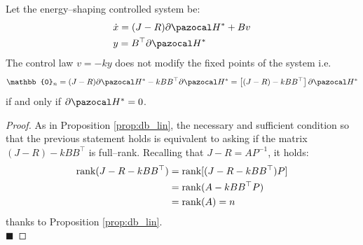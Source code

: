 \begin{prop}
Let the energy--shaping controlled system be:
\begin{align*}
    &\dot{x}=(J-R)\partial\Ha^* + Bv\\
    &y = B^\top\partial\Ha^* 
\end{align*}
The control law $v = -ky$ does not modify the fixed points of the system i.e.
\[\mathbb{0}_n=(J-R)\partial\Ha^*-kBB^\top\partial\Ha^*=\left[(J-R)-kBB^\top\right]\partial\Ha^*\]
if and only if $\partial\Ha^*=0$.
\end{prop}
\begin{proof}
As in Proposition \ref{prop:db_lin}, the necessary and sufficient condition so that the previous statement holds is equivalent to asking if the matrix $(J-R)-kBB^\top$ is full--rank.
Recalling that $J-R=AP^{-1}$, it holds:
\begin{align*}
    \text{rank}(J-R-kBB^\top) &= \text{rank}[(J-R-kBB^\top)P]\\
    &=\text{rank}(A-kBB^\top P)\\
    &=\text{rank}(A)=n
\end{align*}
thanks to Proposition \ref{prop:db_lin}.\\
$\blacksquare$
\end{proof}
\fi
%
